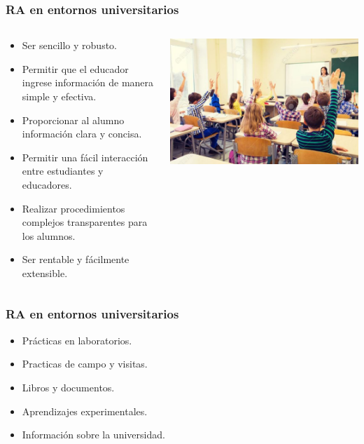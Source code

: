 \begin{frame}
	\frametitle{RA en entornos universitarios}
		\begin{columns}
			\begin{column}{0.6\textwidth}
				\begin{itemize}
					\item Ser sencillo y robusto.
					\item Permitir que el educador ingrese información de manera simple y efectiva.
					\item Proporcionar al alumno información clara y concisa.
					\item Permitir una fácil interacción entre estudiantes y educadores.
					\item Realizar procedimientos complejos transparentes para los alumnos.
					\item Ser rentable y fácilmente extensible.
				\end{itemize}
				\endblock{}
			\end{column}
			\begin{column}{0.4\textwidth}
				\vfill 
				\begin{center}
					\includegraphics[width=0.9\linewidth]{Images/clase}
				\end{center}
			\end{column}		
		\end{columns}
\end{frame}



\begin{frame}
	\frametitle{RA en entornos universitarios}
			\begin{itemize}
				\item Prácticas en laboratorios.
			
				\item Practicas de campo y visitas.
			
				\item Libros y documentos.
				
				\item Aprendizajes experimentales.
			
				\item Información sobre la universidad.
				
			\end{itemize}
		\endblock{}
\end{frame}

